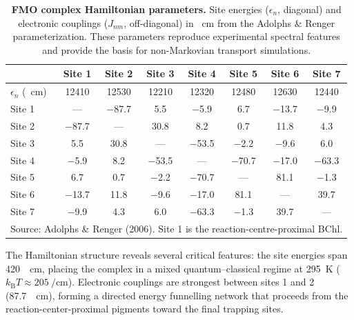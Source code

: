\documentclass[11pt,a4paper]{article}
\begin{document}
\begin{table}[ht]
\centering
\caption{\textbf{FMO complex Hamiltonian parameters.} Site energies ($\epsilon_n$, diagonal) and electronic couplings ($J_{nm}$, off-diagonal) in \si{\per\cm} from the Adolphs \& Renger parameterization. These parameters reproduce experimental spectral features and provide the basis for non-Markovian transport simulations.}
\label{tab:fmo_hamiltonian}
\begin{tabular}{lccccccc}
	\toprule
	                            & \textbf{Site 1} & \textbf{Site 2} & \textbf{Site 3} & \textbf{Site 4} & \textbf{Site 5} & \textbf{Site 6} & \textbf{Site 7} \\ \midrule
	$\epsilon_n$ (\si{\per\cm}) &      12410      &      12530      &      12210      &      12320      &      12480      &      12630      &      12440      \\ \midrule
	Site 1                      &       ---       &     $-$87.7     &       5.5       &     $-$5.9      &       6.7       &     $-$13.7     &     $-$9.9      \\
	Site 2                      &     $-$87.7     &       ---       &      30.8       &       8.2       &       0.7       &      11.8       &       4.3       \\
	Site 3                      &       5.5       &      30.8       &       ---       &     $-$53.5     &     $-$2.2      &     $-$9.6      &       6.0       \\
	Site 4                      &     $-$5.9      &       8.2       &     $-$53.5     &       ---       &     $-$70.7     &     $-$17.0     &     $-$63.3     \\
	Site 5                      &       6.7       &       0.7       &     $-$2.2      &     $-$70.7     &       ---       &      81.1       &     $-$1.3      \\
	Site 6                      &     $-$13.7     &      11.8       &     $-$9.6      &     $-$17.0     &      81.1       &       ---       &      39.7       \\
	Site 7                      &     $-$9.9      &       4.3       &       6.0       &     $-$63.3     &     $-$1.3      &      39.7       &       ---       \\ \bottomrule
	\multicolumn{8}{l}{\scriptsize Source: Adolphs \& Renger (2006). Site 1 is the reaction-centre-proximal BChl.}
\end{tabular}
\end{table}

The Hamiltonian structure reveals several critical features: the site energies span \SI{420}{\per\cm}, placing the complex in a mixed quantum--classical regime at \SI{295}{\kelvin} ($k_{\mathrm{B}}T \approx \SI{205}{\per\cm}$). Electronic couplings are strongest between sites 1 and 2 (\SI{87.7}{\per\cm}), forming a directed energy funnelling network that proceeds from the reaction-center-proximal pigments toward the final trapping sites.
\end{document}
